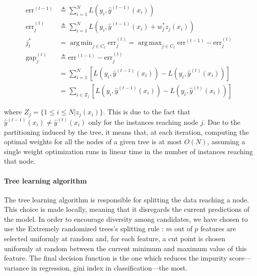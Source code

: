 \documentclass{article}
\DeclareMathOperator*{\argmin}{arg\,min}
\DeclareMathOperator*{\argmax}{arg\,max}
\begin{document}
\vspace*{-\baselineskip}
\begin{align}\label{eq:nodeSel}
\text{err}^{(t-1)} & \triangleq \sum_{i=1}^{N} L \left(y_i, 
\hat{y}^{(t-1)}(x_i)  \right) \\
\text{err}_j^{(t)} & \triangleq \sum_{i=1}^{N} L \left(y_i, 
\hat{y}^{(t-1)}(x_i) + w_j^* z_j(x_i)  \right) \\
j_t^* &= \argmin_{j \in C_t} \text{err}_j^{(t)} = \argmax_{j \in C_t} 
\text{err}^{(t-1)} - \text{err}_j^{(t)} \\
\text{gap}_j^{(t)} & \triangleq \text{err}^{(t-1)} - \text{err}_j^{(t)} \\
&= \sum_{i=1}^{N} \left[ L\left(y_i, \hat{y}^{(t-1)}(x_i)\right) - L\left(y_i, 
\hat{y}^{(t)}(x_i)\right) \right] \\
&= \sum_{i\in Z_j} \left[ L\left(y_i, \hat{y}^{(t-1)}(x_i)\right) - L\left(y_i, 
\hat{y}^{(t)}(x_i)\right) \right]
\end{align}
\vspace*{-\baselineskip}

where $Z_j = \{1 \leq i \leq N | z_j (x_i) \}$. This is due to the fact that
$\hat{y}^{(t-1)}(x_i) \neq \hat{y}^{(t)}(x_i)$ only for the instances 
reaching node $j$. Due to the partitioning induced by the tree, 
it means that, at each iteration, computing the optimal weights for all the 
nodes of a given tree is at most $O(N)$, assuming a single weight optimization 
runs in linear time in the number of instances reaching that node.

\paragraph{Tree learning algorithm}
The tree learning algorithm is responsible for splitting the data reaching a 
node. This choice is made locally, meaning that it disregards the current 
predictions of the model. In order to encourage diversity among candidates, we 
have chosen to use the Extremely randomized trees's splitting rule 
\cite{extratrees}: $m$ out of $p$ features are selected uniformly at random 
and, for each feature, a cut point is chosen uniformly at random between the 
current minimum and maximum value of this feature. The final decision function 
is the one which reduces the impurity score---variance in regression, gini 
index in classification---the most.
\end{document}
